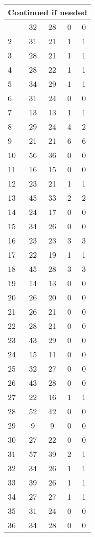 \begin{center}
\begin{longtable}{l|c|c|c|c}
\hline \multicolumn{5}{|r|}{{Continued if needed}} \\ \hline
\endfoot 
1 & 32 & 28 & 0 & 0\\ \hline
2 & 31 & 21 & 1 & 1\\ \hline
3 & 28 & 21 & 1 & 1\\ \hline
4 & 28 & 22 & 1 & 1\\ \hline
5 & 34 & 29 & 1 & 1\\ \hline
6 & 31 & 24 & 0 & 0\\ \hline
7 & 13 & 13 & 1 & 1\\ \hline
8 & 29 & 24 & 4 & 2\\ \hline
9 & 21 & 21 & 6 & 6\\ \hline
10 & 56 & 36 & 0 & 0\\ \hline
11 & 16 & 15 & 0 & 0\\ \hline
12 & 23 & 21 & 1 & 1\\ \hline
13 & 45 & 33 & 2 & 2\\ \hline
14 & 24 & 17 & 0 & 0\\ \hline
15 & 34 & 26 & 0 & 0\\ \hline
16 & 23 & 23 & 3 & 3\\ \hline
17 & 22 & 19 & 1 & 1\\ \hline
18 & 45 & 28 & 3 & 3\\ \hline
19 & 14 & 13 & 0 & 0\\ \hline
20 & 26 & 20 & 0 & 0\\ \hline
21 & 26 & 21 & 0 & 0\\ \hline
22 & 28 & 21 & 0 & 0\\ \hline
23 & 43 & 29 & 0 & 0\\ \hline
24 & 15 & 11 & 0 & 0\\ \hline
25 & 32 & 27 & 0 & 0\\ \hline
26 & 43 & 28 & 0 & 0\\ \hline
27 & 22 & 16 & 1 & 1\\ \hline
28 & 52 & 42 & 0 & 0\\ \hline
29 & 9 & 9 & 0 & 0\\ \hline
30 & 27 & 22 & 0 & 0\\ \hline
31 & 57 & 39 & 2 & 1\\ \hline
32 & 34 & 26 & 1 & 1\\ \hline
33 & 39 & 26 & 1 & 1\\ \hline
34 & 27 & 27 & 1 & 1\\ \hline
35 & 31 & 24 & 0 & 0\\ \hline
36 & 34 & 28 & 0 & 0\\ \hline

\end{longtable}
\end{center}
